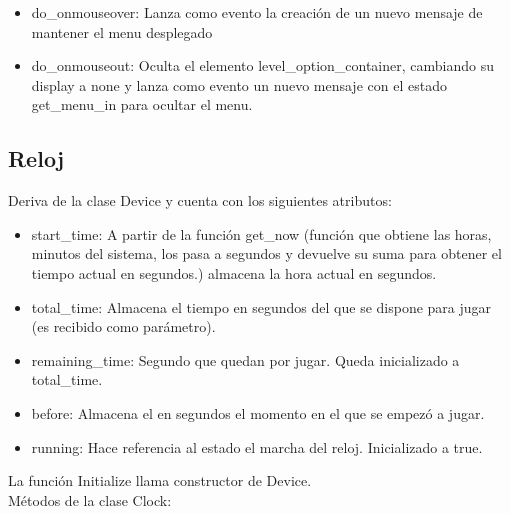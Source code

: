 \begin{itemize}
 \item do\_onmouseover: Lanza como evento la creación de un nuevo mensaje de mantener el menu desplegado

 \item do\_onmouseout: Oculta el elemento level\_option\_container, cambiando su display a none y lanza como evento un nuevo mensaje con el estado 
get\_menu\_in para ocultar el menu.
\end{itemize}


\subsection{Reloj}
\label{subsection:reloj}

Deriva de la clase Device y cuenta con los siguientes atributos:

\begin{itemize}
 \item start\_time: A partir de la función get\_now (función que obtiene las horas, minutos del sistema, los pasa a segundos y devuelve su suma para 
obtener el tiempo actual en segundos.) almacena la hora actual en segundos.

 \item total\_time: Almacena el tiempo en segundos del que se dispone para jugar (es recibido como parámetro).
 
 \item remaining\_time: Segundo que quedan por jugar. Queda inicializado a total\_time.
 
 \item before: Almacena el en segundos el momento en el que se empezó a jugar.
 
 \item running: Hace referencia al estado el marcha del reloj. Inicializado a true.
\end{itemize}

La función Initialize llama constructor de Device.\\

Métodos de la clase Clock:

